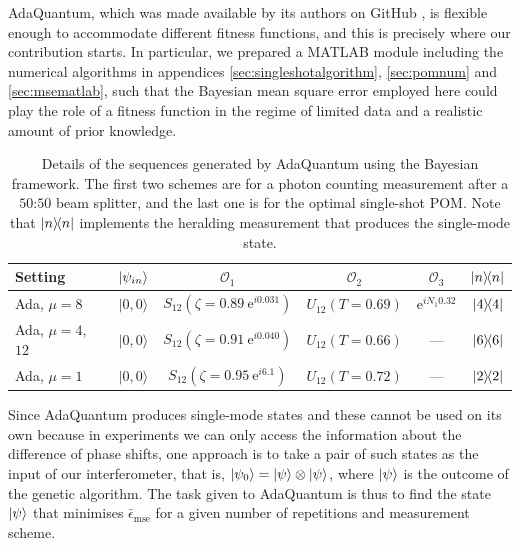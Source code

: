 AdaQuantum, which was made available by its authors on GitHub \cite{adaquantum2019}, is flexible enough to accommodate different fitness functions, and this is precisely where our contribution starts. In particular, we prepared a MATLAB module including the numerical algorithms in appendices \ref{sec:singleshotalgorithm}, \ref{sec:pomnum} and \ref{sec:msematlab}, such that the Bayesian mean square error employed here could play the role of a fitness function in the regime of limited data and a realistic amount of prior knowledge. 

\begin{table} [t]
\centering
{\renewcommand{\arraystretch}{1.5} 
\begin{tabular}{|l|c|c|c|c|c|}
\hline
Setting & $\ket{\psi_{in}}$ & $\mathcal{O}_1$ & $\mathcal{O}_2$ & $\mathcal{O}_3$ & $\ketbra{n}$ \\
\hline
Ada, $\mu = 8$ & $|0,0\rangle$ & $S_{12}(\zeta = 0.89~\mathrm{e}^{i 0.031})$ & $U_{12}(T=0.69)$ &  $\mathrm{e}^{i N_1 0.32}$ & $\ketbra{4}$  \\
Ada, $\mu = 4$, $12$ & $|0,0\rangle$ & $S_{12}(\zeta = 0.91~\mathrm{e}^{i 0.040})$ & $U_{12}(T=0.66)$ & --- & $\ketbra{6}$ \\
Ada, $\mu = 1$ & $|0,0\rangle$ & $S_{12}(\zeta = 0.95~\mathrm{e}^{i 6.1})$ & $U_{12}(T=0.72)$ & --- & $\ketbra{2}$\\
\hline
\end{tabular}}
\caption[Sequences of quantum operations generated by AdaQuantum]{Details of the sequences generated by AdaQuantum using the Bayesian framework. The first two schemes are for a photon counting measurement after a $50$:$50$ beam splitter, and the last one is for the optimal single-shot POM. Note that $\ketbra{n}$ implements the heralding measurement that produces the single-mode state.}
\label{toolbox_summary}
\end{table}

Since AdaQuantum produces single-mode states and these cannot be used on its own because in experiments we can only access the information about the difference of phase shifts, one approach is to take a pair of such states as the input of our interferometer, that is, $\ket{\psi_0} = \ket{\psi}\otimes \ket{\psi}$, where $\ket{\psi}$ is the outcome of the genetic algorithm. The task given to AdaQuantum is thus to find the state $\ket{\psi}$ that minimises $\bar{\epsilon}_{\mathrm{mse}}$ for a given number of repetitions and measurement scheme. 

